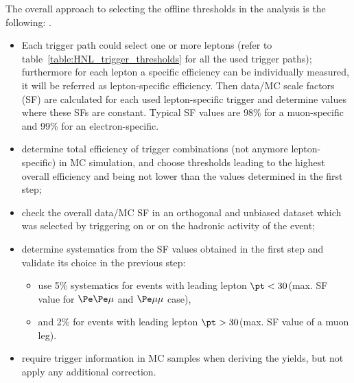 The overall approach to selecting the offline thresholds in the analysis is the following:
.


\begin{itemize}
\setlength\itemsep{-0.1em}
\item Each trigger path could select one or more leptons (refer to
  table~\ref{table:HNL_trigger_thresholds} for all the used trigger paths); furthermore for
  each lepton a specific efficiency can be individually measured, it
  will be referred as lepton-specific efficiency. Then data/MC scale
  factors (SF) are calculated for each used
  lepton-specific trigger and determine values where these SFs are
  constant. 
 Typical SF values are 98\% for a muon-specific and 99\% for an electron-specific. 
\item determine total efficiency of trigger combinations (not anymore
  lepton-specific) in MC simulation, and choose \pt thresholds leading to the highest overall efficiency and being not lower than the values determined in the first step;
\item check the overall data/MC SF in an orthogonal and unbiased dataset which was
  selected by triggering on \ptmiss or on the hadronic activity of the event;
\item determine systematics from the SF values obtained in the first step and validate its choice in the previous step: 
\begin{itemize}
\setlength\itemsep{-0.2em}
\item use 5\% systematics for events with leading lepton $\pt < 30$\GeV (max. SF value for $\Pe\Pe\mu$ and $\Pe\mu\mu$ case),
\item and 2\% for events with leading lepton $\pt > 30$\GeV (max. SF value of a muon leg).
\end{itemize}
\item require trigger information in MC samples when deriving the yields, but not apply any additional correction.
\end{itemize}


